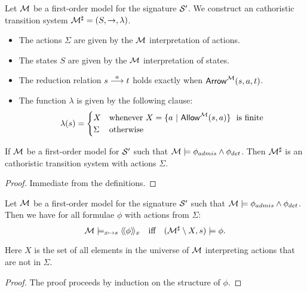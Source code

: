 \begin{definition}
Let $\mathcal{M}$ be a first-order model for the signature $\mathcal{S}'$.
We construct an cathoristic transition system
$\mathcal{M}^{\sharp} = (S, \rightarrow, \lambda)$.
\begin{itemize}

\item The actions $\Sigma$ are given by the $\mathcal{M}$ interpretation of actions.

\item The states $S$ are given by the $\mathcal{M}$ interpretation of states.

\item The reduction relation $s \stackrel{a}{\longrightarrow} t$ holds exactly when
  $\mathsf{Arrow}^{\mathcal{M}}(s, a, t)$.

\item The function $\lambda$ is given by the following clause:
  \[
     \lambda(s) 
        =
     \begin{cases} 
       X & \text{whenever}\ X = \{a \ |\ \ALLOWED{\CAL{M}}{s}{a} \}\ \text{ is finite} \\
       \Sigma & \text{otherwise}
     \end{cases}
  \]

\end{itemize}

\end{definition}

\begin{lemma}
If $\mathcal{M}$ be a first-order model for $\mathcal{S}'$ such that $\mathcal{M}
\models \phi_{admis} \land \phi_{det}$.  Then $\mathcal{M}^{\sharp}$ is an
cathoristic transition system with actions $\Sigma$.
\end{lemma}
\begin{proof}
Immediate from the definitions.
\end{proof}

\begin{theorem}\label{correspondence:theorem:223}
Let $\mathcal{M}$ be a first-order model for the signature $\mathcal{S}'$ such
that $\mathcal{M} \models \phi_{admis} \land \phi_{det}$.  Then we have for
all \cathoristic{} formulae $\phi$ with actions from $\Sigma$:
\[
   \mathcal{M} \models_{x \mapsto s} \langle\!\langle \phi \rangle\!\rangle_x 
        \quad  \text{iff} \quad 
   (\mathcal{M}^{\sharp} \setminus X, s) \models \phi.
\]
\end{theorem}
Here $X$ is the set of all elements in the universe of $\mathcal{M}$ interpreting
actions that are not in $\Sigma$.
\begin{proof}
The proof proceeds by induction on the structure of $\phi$. 
\end{proof}


